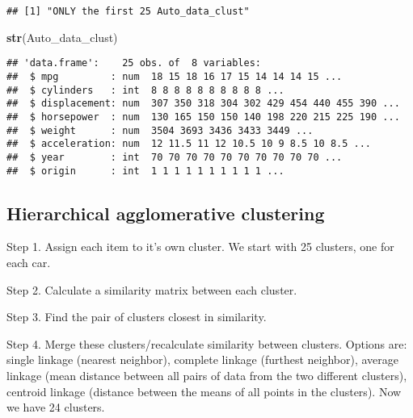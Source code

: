 \documentclass[11pt,]{article}
\newenvironment{Shaded}{\begin{snugshade}}{\end{snugshade}}
\newcommand{\CommentTok}[1]{\textcolor[rgb]{0.56,0.35,0.01}{\textit{#1}}}
\newcommand{\DecValTok}[1]{\textcolor[rgb]{0.00,0.00,0.81}{#1}}
\newcommand{\KeywordTok}[1]{\textcolor[rgb]{0.13,0.29,0.53}{\textbf{#1}}}
\newcommand{\NormalTok}[1]{#1}
\newcommand{\OperatorTok}[1]{\textcolor[rgb]{0.81,0.36,0.00}{\textbf{#1}}}
\newcommand{\StringTok}[1]{\textcolor[rgb]{0.31,0.60,0.02}{#1}}
\begin{document}
\begin{Shaded}
\end{Shaded}

\begin{verbatim}
## [1] "ONLY the first 25 Auto_data_clust"
\end{verbatim}

\begin{Shaded}
\begin{Highlighting}[]
\KeywordTok{str}\NormalTok{(Auto_data_clust)}
\end{Highlighting}
\end{Shaded}

\begin{verbatim}
## 'data.frame':    25 obs. of  8 variables:
##  $ mpg         : num  18 15 18 16 17 15 14 14 14 15 ...
##  $ cylinders   : int  8 8 8 8 8 8 8 8 8 8 ...
##  $ displacement: num  307 350 318 304 302 429 454 440 455 390 ...
##  $ horsepower  : num  130 165 150 150 140 198 220 215 225 190 ...
##  $ weight      : num  3504 3693 3436 3433 3449 ...
##  $ acceleration: num  12 11.5 11 12 10.5 10 9 8.5 10 8.5 ...
##  $ year        : int  70 70 70 70 70 70 70 70 70 70 ...
##  $ origin      : int  1 1 1 1 1 1 1 1 1 1 ...
\end{verbatim}

\hypertarget{hierarchical-agglomerative-clustering}{%
\subsection{Hierarchical agglomerative
clustering}\label{hierarchical-agglomerative-clustering}}

Step 1. Assign each item to it's own cluster. We start with 25 clusters,
one for each car.

Step 2. Calculate a similarity matrix between each cluster.

Step 3. Find the pair of clusters closest in similarity.

Step 4. Merge these clusters/recalculate similarity between clusters.
Options are: single linkage (nearest neighbor), complete linkage
(furthest neighbor), average linkage (mean distance between all pairs of
data from the two different clusters), centroid linkage (distance
between the means of all points in the clusters). Now we have 24
clusters.
\end{document}
